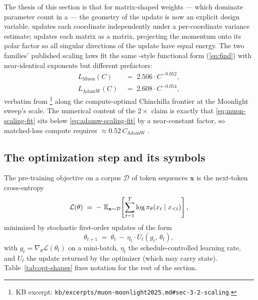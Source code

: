 The thesis of this section is that for matrix-shaped weights ---
which dominate parameter count in a  --- the geometry of
the update is now an explicit design variable.  updates each
coordinate independently under a per-coordinate variance estimate;
 updates each matrix as a matrix, projecting the momentum onto
its polar factor so all singular directions of the update have equal
energy. The two families' published scaling laws fit the same
\citet{kaplan2020}-style functional form (\cref{eq:6nd}) with
near-identical exponents but different prefactors:
\begin{align}
L_{\mathrm{Muon}}(C)  &\;=\; 2.506 \cdot C^{-0.052},
   \label{eq:muon-scaling-fit} \\
L_{\mathrm{AdamW}}(C) &\;=\; 2.608 \cdot C^{-0.054},
   \label{eq:adamw-scaling-fit}
\end{align}
verbatim from \citet[\S 3.2, Table 3]{muon-moonlight2025}\footnote{KB
excerpt: \nolinkurl{kb/excerpts/muon-moonlight2025.md#sec-3-2-scaling}.}
along the compute-optimal Chinchilla frontier at the Moonlight sweep's
scale. The numerical content of the $2\times$ claim is exactly that
\cref{eq:muon-scaling-fit} sits below \cref{eq:adamw-scaling-fit} by a
near-constant factor, so matched-loss compute requires
$\approx 0.52\,C_{\mathrm{AdamW}}$ \citep[Figure
1a]{muon-moonlight2025}.

\subsection{The optimization step and its symbols}
\label{sec:opt-setup}

The pre-training objective on a corpus $\mathcal{D}$ of token
sequences $\mathbf{x}$ is the next-token cross-entropy
\begin{equation}
\mathcal{L}(\theta) \;=\; -\,\operatorname{\mathbb{E}}_{\mathbf{x} \sim \mathcal{D}}\!\left[
   \sum_{t=1}^{T} \log \pi_\theta(x_t \mid x_{<t}) \right],
\label{eq:opt-pretrain-loss}
\end{equation}
minimized by stochastic first-order updates of the form
\begin{equation}
\theta_{t+1} \;=\; \theta_t \,-\, \eta_t \cdot U_t(g_t,\,\theta_t),
\label{eq:opt-step}
\end{equation}
with $g_t = \nabla_\theta \mathcal{L}(\theta_t)$ on a mini-batch,
$\eta_t$ the schedule-controlled learning rate, and $U_t$ the update
returned by the optimizer (which may carry state).
Table~\ref{tab:opt-shapes} fixes notation for the rest of the section.

